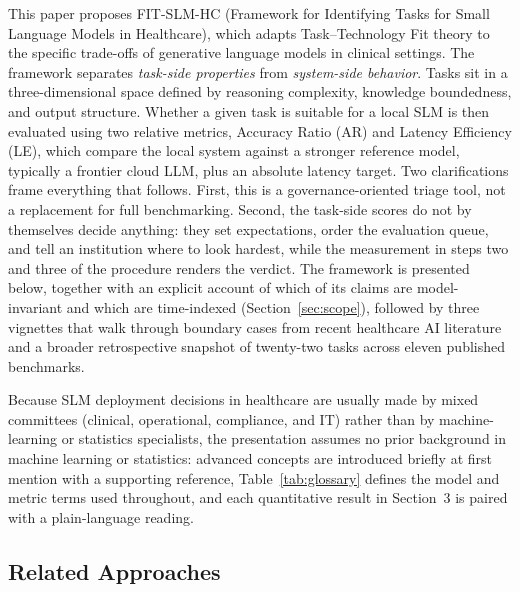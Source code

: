 \documentclass[11pt]{article}
\begin{document}
This paper proposes FIT-SLM-HC (Framework for Identifying Tasks for Small Language Models in Healthcare), which adapts Task--Technology Fit theory \cite{Goodhue1995, Zigurs1998} to the specific trade-offs of generative language models in clinical settings. The framework separates \emph{task-side properties} from \emph{system-side behavior}. Tasks sit in a three-dimensional space defined by reasoning complexity, knowledge boundedness, and output structure. Whether a given task is suitable for a local SLM is then evaluated using two relative metrics, Accuracy Ratio (AR) and Latency Efficiency (LE), which compare the local system against a stronger reference model, typically a frontier cloud LLM, plus an absolute latency target. Two clarifications frame everything that follows. First, this is a governance-oriented triage tool, not a replacement for full benchmarking. Second, the task-side scores do not by themselves decide anything: they set expectations, order the evaluation queue, and tell an institution where to look hardest, while the measurement in steps two and three of the procedure renders the verdict. The framework is presented below, together with an explicit account of which of its claims are model-invariant and which are time-indexed (Section~\ref{sec:scope}), followed by three vignettes that walk through boundary cases from recent healthcare AI literature and a broader retrospective snapshot of twenty-two tasks across eleven published benchmarks.

Because SLM deployment decisions in healthcare are usually made by mixed committees (clinical, operational, compliance, and IT) rather than by machine-learning or statistics specialists, the presentation assumes no prior background in machine learning or statistics: advanced concepts are introduced briefly at first mention with a supporting reference, Table~\ref{tab:glossary} defines the model and metric terms used throughout, and each quantitative result in Section~3 is paired with a plain-language reading.

\subsection{Related Approaches}
\label{sec:related}
\end{document}
